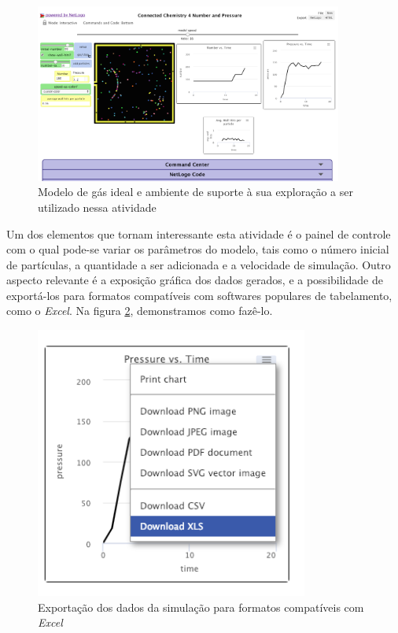 \begin{figure}[!htb]
  \caption{Modelo de gás ideal e ambiente de suporte à sua exploração a ser utilizado nessa atividade}
  \begin{center}
    \includegraphics[width=0.9\textwidth]{imagens/numero-e-pressao}
  \end{center}
  \label{fig:numero-e-pressao}
\end{figure}

Um dos elementos que tornam interessante esta atividade é o painel de controle com o qual pode-se variar os parâmetros do modelo, tais como o número inicial de partículas, a quantidade a ser adicionada e a velocidade de simulação. Outro aspecto relevante é a exposição gráfica dos dados gerados, e a possibilidade de exportá-los para formatos compatíveis com softwares populares de tabelamento, como o \textit{Excel}. Na figura \ref{fig:exportar-dados}, demonstramos como fazê-lo.

\begin{figure}[!htb]
  \caption{Exportação dos dados da simulação para formatos compatíveis com \textit{Excel}}
  \begin{center}
    \includegraphics[width=0.8\textwidth]{imagens/exportar-dados}
  \end{center}
  \label{fig:exportar-dados}
\end{figure}

